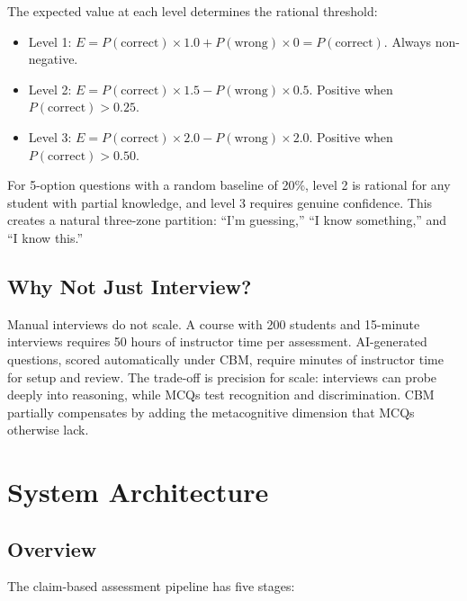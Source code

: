 \documentclass[sigconf]{acmart}
\begin{document}
The expected value at each level determines the rational threshold:
\begin{itemize}
    \item Level 1: $E = P(\text{correct}) \times 1.0 + P(\text{wrong}) \times 0 = P(\text{correct})$. Always non-negative.
    \item Level 2: $E = P(\text{correct}) \times 1.5 - P(\text{wrong}) \times 0.5$. Positive when $P(\text{correct}) > 0.25$.
    \item Level 3: $E = P(\text{correct}) \times 2.0 - P(\text{wrong}) \times 2.0$. Positive when $P(\text{correct}) > 0.50$.
\end{itemize}

For 5-option questions with a random baseline of 20\%, level 2 is rational for any student with partial knowledge, and level 3 requires genuine confidence. This creates a natural three-zone partition: ``I'm guessing,'' ``I know something,'' and ``I know this.''

\subsection{Why Not Just Interview?}

Manual interviews do not scale. A course with 200 students and 15-minute interviews requires 50 hours of instructor time per assessment. AI-generated questions, scored automatically under CBM, require minutes of instructor time for setup and review. The trade-off is precision for scale: interviews can probe deeply into reasoning, while MCQs test recognition and discrimination. CBM partially compensates by adding the metacognitive dimension that MCQs otherwise lack.

\section{System Architecture}

\subsection{Overview}

The claim-based assessment pipeline has five stages:
\end{document}
